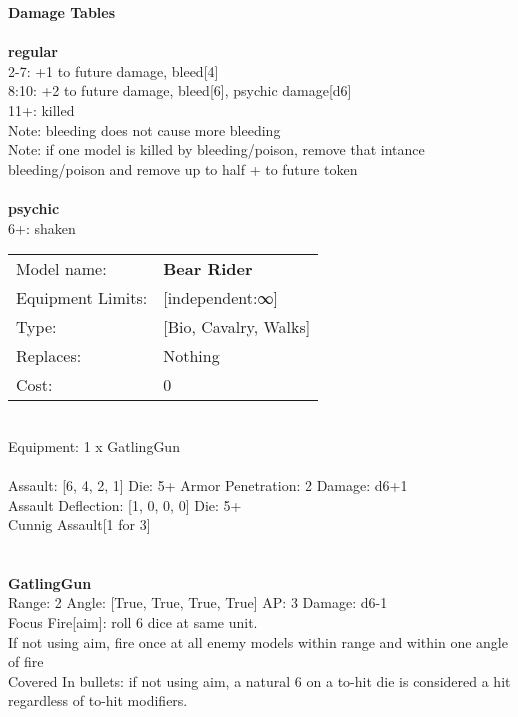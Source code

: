 {\bf Damage Tables} \\
\ \\ {\bf regular } \\
2-7: +1 to future damage, bleed[4] \\
8:10: +2 to future damage, bleed[6], psychic damage[d6] \\
11+: killed \\
Note: bleeding does not cause more bleeding \\
Note: if one model is killed by bleeding/poison, remove that intance \\ bleeding/poison and remove up to half + to future token \\
\ \\ {\bf psychic } \\
6+: shaken \\


\noindent
\begin{tabular}{ll}
Model name: &{\bf Bear Rider } \\
Equipment Limits: &[independent:∞] \\
Type: &[Bio, Cavalry, Walks] \\
Replaces: &Nothing \\
Cost: & 0\\
\end{tabular}
\ \\
Equipment: 1 x GatlingGun \\
\ \\
Assault: [6, 4, 2, 1] Die: 5+ Armor Penetration: 2 Damage: d6+1 \\
Assault Deflection: [1, 0, 0, 0] Die: 5+\\
\indent Cunnig Assault[1 for 3]\\ 
 
\ \\

\ \\
{\bf GatlingGun } \\



Range: 2  Angle: [True, True, True, True] AP: 3 Damage: d6-1 \\
Focus Fire[aim]: roll 6 dice at same unit.\\ 
If not using aim, fire once at all enemy models within range and within one angle of fire\\ 
Covered In bullets: if not using aim, a natural 6 on a to-hit die is considered a hit regardless of to-hit modifiers.\\ 




